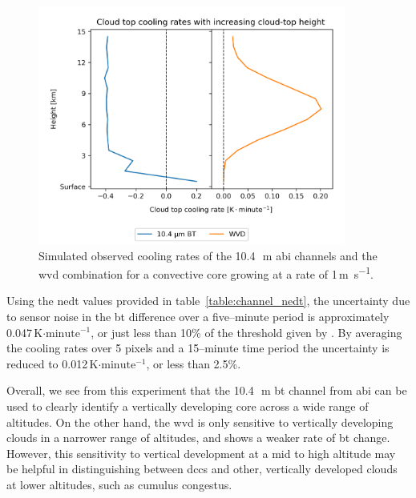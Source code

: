 \begin{figure}[tp]
    \includegraphics[width=0.9\textwidth]{figures/chapter1_07.png}
    \caption[
    Simulated observed cooling rates of the 10.4\,\unit{\mu m} \acrshort{abi} channels and the \acrshort{wvd} combination for a convective core growing at a rate of 1\,\unit{m s^{-1}}
    ]{
    Simulated observed cooling rates of the 10.4\,\unit{\mu m} \acrshort{abi} channels and the \acrshort{wvd} combination for a convective core growing at a rate of 1\,\unit{m s^{-1}}.
    }
    \label{fig:cloud_height_cooling_rates}
\end{figure}

Using the \acrshort{nedt} values provided in table~\ref{table:channel_nedt}, the uncertainty due to sensor noise in the \acrshort{bt} difference over a five--minute period is approximately 0.047\,K$\cdot \mathrm{minute^{-1}}$, or just less than 10\% of the threshold given by \citet{roberts_nowcasting_2003}.
By averaging the cooling rates over 5 pixels and a 15--minute time period the uncertainty is reduced to 0.012\,K$\cdot \mathrm{minute^{-1}}$, or less than 2.5\%.

Overall, we see from this experiment that the 10.4\,\unit{\mu m} \acrshort{bt} channel from \acrshort{abi} can be used to clearly identify a vertically developing core across a wide range of altitudes.
On the other hand, the \acrshort{wvd} is only sensitive to vertically developing clouds in a narrower range of altitudes, and shows a weaker rate of \acrshort{bt} change.
However, this sensitivity to vertical development at a mid to high altitude may be helpful in distinguishing between \acrshort{dcc}s and other, vertically developed clouds at lower altitudes, such as cumulus congestus.

